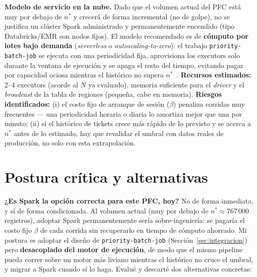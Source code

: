 \documentclass[11pt,a4paper]{article}
\begin{document}
\textbf{Modelo de servicio en la nube.} Dado que el volumen actual del PFC está muy por debajo
de \(n^{*}\) y crecerá de forma incremental (no de golpe), no se justifica un clúster Spark
administrado y permanentemente encendido (tipo Databricks/EMR con nodos fijos). El modelo
recomendado es de \textbf{cómputo por lotes bajo demanda} (\emph{serverless} o
\emph{autoscaling-to-zero}): el trabajo \texttt{priority-batch-job} se ejecuta con una
periodicidad fija, aprovisiona los executors solo durante la ventana de ejecución y se apaga el
resto del tiempo, evitando pagar por capacidad ociosa mientras el histórico no supera
\(n^{*}\)~\cite{shojaeerad2024serverless}. \textbf{Recursos estimados:} 2--4 executors (acorde al
\(N\) ya evaluado), memoria suficiente para el \emph{driver} y el \emph{broadcast} de la tabla
de regiones (pequeña, cabe en memoria). \textbf{Riesgos identificados:} (i) el costo fijo de
arranque de sesión (\(\beta\)) penaliza corridas muy frecuentes --- una periodicidad horaria o
diaria lo amortiza mejor que una por minuto; (ii) si el histórico de tickets crece más rápido de
lo previsto y se acerca a \(n^{*}\) antes de lo estimado, hay que revalidar el umbral con datos
reales de producción, no solo con esta extrapolación.

\section{Postura crítica y alternativas}
\label{sec:postura}

\textbf{¿Es Spark la opción correcta para este PFC, hoy?} No de forma inmediata, y sí de forma
condicionada. Al volumen actual (muy por debajo de \(n^{*}\approx\)767\,000 registros), adoptar
Spark permanentemente sería sobre-ingeniería: se pagaría el costo fijo \(\beta\) de cada corrida
sin recuperarlo en tiempo de cómputo ahorrado. Mi postura es adoptar el diseño de
\texttt{priority-batch-job} (Sección~\ref{sec:integracion}) pero \textbf{desacoplado del motor
de ejecución}, de modo que el mismo pipeline pueda correr sobre un motor más liviano mientras el
histórico no cruce el umbral, y migrar a Spark cuando sí lo haga. Evalué y descarté dos
alternativas concretas:
\end{document}
